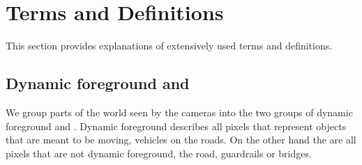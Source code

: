 
\section{Terms and Definitions}
This section provides explanations of extensively used terms and definitions. 

\subsection{Dynamic foreground and \Sc{}}
\label{sec:dynamic_foreground_static_scene}
We group parts of the world seen by the cameras into the two groups of dynamic foreground and \Sc{}.
Dynamic foreground describes all pixels that represent objects that are meant to be moving, \eg{} vehicles on the roads.
On the other hand the \Sc{} are all pixels that are not dynamic foreground, \eg{} the road, guardrails or bridges.